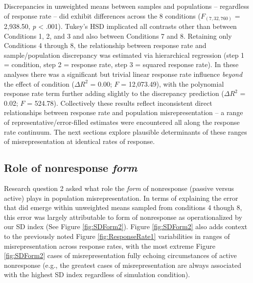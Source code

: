 \documentclass[
  man,mask]{apa7}
\begin{document}
Discrepancies in unweighted means between samples and populations -- regardless of response rate -- did exhibit differences across the 8 conditions (\(F_{(7,32,760)}\) = 2,938.50, \emph{p} \textless{} .001). Tukey's HSD implicated all contrasts other than between Conditions 1, 2, and 3 and also between Conditions 7 and 8. Retaining only Conditions 4 through 8, the relationship between response rate and sample/population discrepancy was estimated via hierarchical regression (step 1 = condition, step 2 = response rate, step 3 = squared response rate). In these analyses there was a significant but trivial linear response rate influence \emph{beyond} the effect of condition (\(\Delta{R^2}\) = 0.00; \(F\) = 12,073.49), with the polynomial response rate term further adding slightly to the discrepancy prediction (\(\Delta{R^2}\) = 0.02; \(F\) = 524.78). Collectively these results reflect inconsistent direct relationships between response rate and population misrepresentation -- a range of representative/error-filled estimates were encountered all along the response rate continuum. The next sections explore plausible determinants of these ranges of misrepresentation at identical rates of response.

\subsection{\texorpdfstring{Role of nonresponse \emph{form}}{Role of nonresponse form}}\label{role-of-nonresponse-form}

Research question 2 asked what role the \emph{form} of nonresponse (passive versus active) plays in population misrepresentation. In terms of explaining the error that did emerge within unweighted means sampled from conditions 4 though 8, this error was largely attributable to form of nonresponse as operationalized by our SD index (See Figure \ref{fig:SDForm2}). Figure \ref{fig:SDForm2} also adds context to the previously noted Figure \ref{fig:ResponseRate1} variabilities in ranges of misrepresentation across response rates, with the most extreme Figure \ref{fig:SDForm2} cases of misrepresentation fully echoing circumstances of active nonresponse (e.g., the greatest cases of misrepresentation are always associated with the highest SD index regardless of simulation condition).
\end{document}
